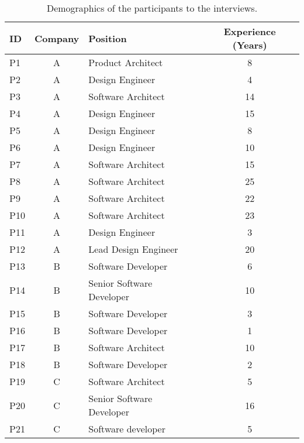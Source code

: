 \begin{table}[h!]
    \centering
    \footnotesize
    \caption{Demographics of the participants to the interviews.}
    \label{c2:tab:participants}
    \begin{tabular}{lclc}
    \toprule
    ID & Company & Position & Experience (Years)\\ \midrule
    P1 & A & Product Architect & 8 \\
    P2 & A & Design Engineer & 4 \\
    P3 & A & Software Architect & 14 \\
    P4 & A & Design Engineer & 15 \\
    P5 & A & Design Engineer & 8 \\
    P6 & A & Design Engineer & 10 \\
    P7 & A & Software Architect & 15 \\
    P8 & A & Software Architect & 25 \\
    P9 & A & Software Architect & 22 \\
    P10 & A & Software Architect & 23 \\
    P11 & A & Design Engineer & 3 \\
    P12 & A & Lead Design Engineer & 20 \\
    P13 & B & Software Developer & 6 \\
    P14 & B & Senior Software Developer & 10 \\
    P15 & B & Software Developer & 3 \\
    P16 & B & Software Developer & 1 \\
    P17 & B & Software Architect & 10 \\
    P18 & B & Software Developer & 2 \\
    P19 & C & Software Architect & 5 \\
    P20 & C & Senior Software Developer & 16 \\
    P21 & C & Software developer & 5 \\ \bottomrule
    \end{tabular}
\end{table}

